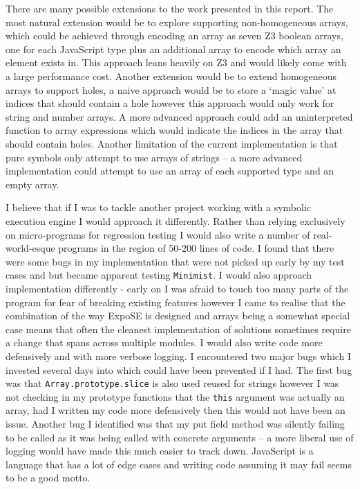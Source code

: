 \documentclass[]{final_report}
\begin{document}
There are many possible extensions to the work presented in this report. The most natural extension would be to explore supporting non-homogeneous arrays, which could be achieved through encoding an array as seven Z3 boolean arrays, one for each JavaScript type plus an additional array to encode which array an element exists in. This approach leans heavily on Z3 and would likely come with a large performance cost. Another extension would be to extend homogeneous arrays to support holes, a naive approach would be to store a `magic value' at indices that should contain a hole however this approach would only work for string and number arrays. A more advanced approach could add an uninterpreted function to array expressions which would indicate the indices in the array that should contain holes. Another limitation of the current implementation is that pure symbols only attempt to use arrays of strings -- a more advanced implementation could attempt to use an array of each supported type and an empty array.


I believe that if I was to tackle another project working with a symbolic execution engine I would approach it differently. Rather than relying exclusively on micro-programs for regression testing I would also write a number of real-world-esque programs in the region of 50-200 lines of code. I found that there were some bugs in my implementation that were not picked up early by my test cases and but became apparent testing \lstinline|Minimist|. I would also approach implementation differently - early on I was afraid to touch too many parts of the program for fear of breaking existing features however I came to realise that the combination of the way  ExpoSE is designed and arrays being a somewhat special case means that often the cleanest implementation of solutions sometimes require a change that spans across multiple modules. I would also write code more defensively and with more verbose logging. I encountered two major bugs which I invested several days into which could have been prevented if I had. The first bug was that \lstinline|Array.prototype.slice| is also used reused for strings however I was not checking in my prototype functions that the \lstinline|this| argument was actually an array, had I written my code more defensively then this would not have been an issue. Another bug I identified was that my put field method was silently failing to be called as it was being called with concrete arguments -- a more liberal use of logging would have made this much easier to track down. JavaScript is a language that has a lot of edge cases and  writing code assuming it may fail seems to be a good motto.
\end{document}
